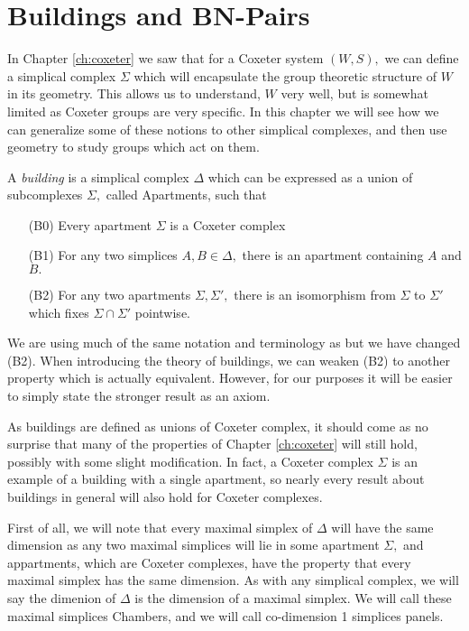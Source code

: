 \documentclass[class=book, crop=false,12 pt]{standalone}
\begin{document}
\chapter{Buildings and BN-Pairs}
\label{ch:buildings}
In Chapter \ref{ch:coxeter} we saw that for a Coxeter system $(W,S),$ we can define a simplical complex $\Sigma$ which will encapsulate the group theoretic structure of $W$ in its geometry. This allows us to understand, $W$ very well, but is somewhat limited as Coxeter groups are very specific. In this chapter we will see how we can generalize some of these notions to other simplical complexes, and then use geometry to study groups which act on them.

\begin{defn}
	\label{defn:building}
	A \emph{building} is a simplical complex $\Delta$ which can be expressed as a union of subcomplexes $\Sigma,$ called Apartments, such that
	\begin{itemize}
		\item[(B0)] Every apartment $\Sigma$ is a Coxeter complex
		\item[(B1)] For any two simplices $A,B\in \Delta,$ there is an apartment containing $A$ and $B.$
		\item[(B2)] For any two apartments $\Sigma,\Sigma',$ there is an isomorphism from $\Sigma$ to $\Sigma'$ which fixes $\Sigma\cap \Sigma'$ pointwise.
	\end{itemize}
\end{defn}

We are using much of the same notation and terminology as \cite{buildings} but we have changed (B2). When introducing the theory of buildings, we can weaken (B2) to another property which is actually equivalent. However, for our purposes it will be easier to simply state the stronger result as an axiom.

As buildings are defined as unions of Coxeter complex, it should come as no surprise that many of the properties of Chapter \ref{ch:coxeter} will still hold, possibly with some slight modification. In fact, a Coxeter complex $\Sigma$ is an example of a building with a single apartment, so nearly every result about buildings in general will also hold for Coxeter complexes.

First of all, we will note that every maximal simplex of $\Delta$ will have the same dimension as any two maximal simplices will lie in some apartment $\Sigma,$ and appartments, which are Coxeter complexes, have the property that every maximal simplex has the same dimension. As with any simplical complex, we will say the dimenion of $\Delta$ is the dimension of a maximal simplex. We will call these maximal simplices Chambers, and we will call co-dimension 1 simplices panels.
\end{document}
